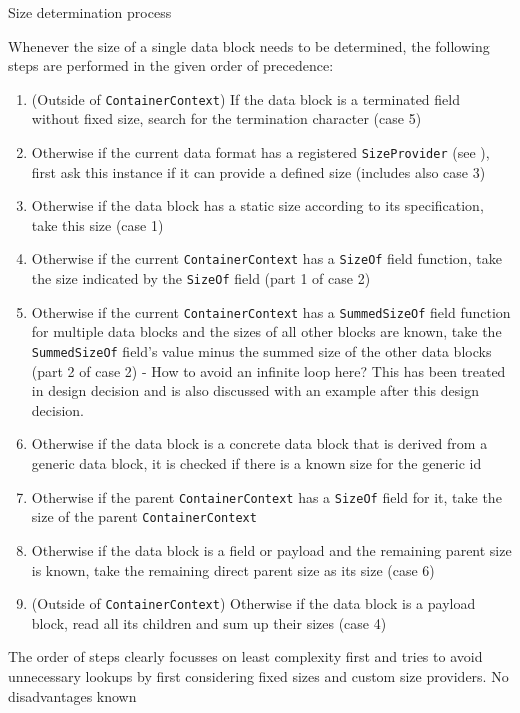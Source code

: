 {%
Size determination process
}
{%
  Whenever the size of a single data block needs to be determined, the following steps are performed in the given order of precedence:
\begin{enumerate}
\item (Outside of \texttt{ContainerContext}) If the data block is a terminated field without fixed size, search for the termination character (case 5)
\item Otherwise if the current data format has a registered \texttt{SizeProvider} (see ), first ask this instance if it can provide a defined size (includes also case 3)
\item Otherwise if the data block has a static size according to its specification, take this size (case 1)
\item Otherwise if the current \texttt{ContainerContext} has a \texttt{SizeOf} field function, take the size indicated by the \texttt{SizeOf} field (part 1 of case 2)
\item Otherwise if the current \texttt{ContainerContext} has a \texttt{SummedSizeOf} field function for multiple data blocks and the sizes of all other blocks are known, take the \texttt{SummedSizeOf} field's value minus the summed size of the other data blocks (part 2 of case 2) - How to avoid an infinite loop here? This has been treated in design decision  and is also discussed with an example after this design decision.
\item Otherwise if the data block is a concrete data block that is derived from a generic data block, it is checked if there is a known size for the generic id  
\item Otherwise if the parent \texttt{ContainerContext} has a \texttt{SizeOf} field for it, take the size of the parent \texttt{ContainerContext}
\item Otherwise if the data block is a field or payload and the remaining parent size is known, take the remaining direct parent size as its size (case 6)
\item (Outside of \texttt{ContainerContext}) Otherwise if the data block is a payload block, read all its children and sum up their sizes (case 4)
\end{enumerate}
}
{%
The order of steps clearly focusses on least complexity first and tries to avoid unnecessary lookups by first considering fixed sizes and custom size providers.
}
{%
No disadvantages known
}

